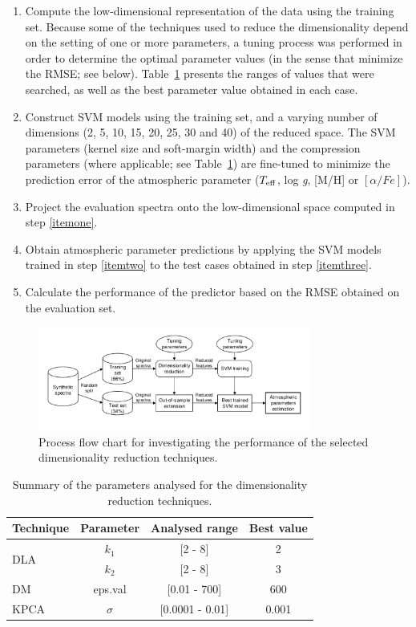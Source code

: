 \documentclass[a4paper,fleqn,usenatbib]{mnras}
\begin{document}
{{{\begin{enumerate}
\item \label{itemone} Compute the low-dimensional representation of
  the data using the training set. Because some of the techniques used
  to reduce the dimensionality depend on the setting of one or more
  parameters, a tuning process was performed in order to determine the
  optimal parameter values (in the sense that minimize the RMSE; 
  see below). Table~\ref{tab:parameters} presents the ranges of 
  values that were searched, as well as the best parameter value
  obtained in each case.
\item \label{itemtwo} Construct SVM models using the training set, and a varying
  number of dimensions (2, 5, 10, 15, 20, 25, 30 and 40) of the
  reduced space. The SVM parameters (kernel size and soft-margin
  width) and the compression parameters (where applicable; see 
  Table~\ref{tab:parameters}) are fine-tuned to minimize the prediction error of the
  atmospheric parameter ($T_{\rm eff}$, log \textit{g}, [M/H] or 
  $\left[ \alpha/Fe \right]$).
\item \label{itemthree} Project the evaluation spectra onto the
  low-dimensional space computed in step \ref{itemone}.
\item Obtain atmospheric parameter predictions by applying the SVM
  models trained in step \ref{itemtwo} to the test cases obtained in
  step \ref{itemthree}.
\item Calculate the performance of the predictor based on the RMSE
  obtained on the evaluation set.
\end{enumerate}

\begin{figure}
\centering\includegraphics[width=0.8\textwidth]{flowchart.pdf}
\caption{Process flow chart for investigating the performance of the 
selected dimensionality reduction techniques.}
\label{fig:flowchart}
\end{figure}

\begin{table}
\centering
\caption{Summary of the parameters analysed for the 
dimensionality reduction techniques.}
\label{tab:parameters}
\begin{tabular}{l c c c}
\hline
\textbf{Technique} & \textbf{Parameter} & \textbf{Analysed range} & \textbf{Best value} \\
\hline
\multirow{2}{*}{DLA} 
	& $k_1$ & [2 - 8]  & 2 \\\cline{2-4}
	& $k_2$ & [2 - 8]  & 3 \\\hline
DM & eps.val & [0.01 - 700] & 600 \\\hline
KPCA & $\sigma$ & [0.0001 - 0.01] & 0.001 \\
\hline
\end{tabular}
\end{table}

}}}
\end{document}
